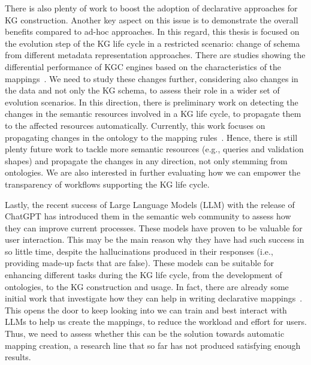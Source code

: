 
There is also plenty of work to boost the adoption of declarative approaches for KG construction. Another key aspect on this issue is to demonstrate the overall benefits compared to ad-hoc approaches. In this regard, this thesis is focused on the evolution step of the KG life cycle in a restricted scenario: change of schema from different metadata representation approaches. There are studies showing the differential performance of KGC engines based on the characteristics of the mappings~\parencite{chaves2019parameters}. We need to study these changes further, considering also changes in the data and not only the KG schema, to assess their role in a wider set of evolution scenarios. 
In this direction, there is preliminary work on detecting the changes in the semantic resources involved in a KG life cycle, to propagate them to the affected resources automatically. Currently, this work focuses on propagating changes in the ontology to the mapping rules~\parencite{herreros2024propagating}. Hence, there is still plenty future work to tackle more semantic resources (e.g., queries and validation shapes) and propagate the changes in any direction, not only stemming from ontologies. 
We are also interested in further evaluating how we can empower the transparency of workflows supporting the KG life cycle.

Lastly, the recent success of Large Language Models (LLM) with the release of ChatGPT has introduced them in the semantic web community to assess how they can improve current processes.
These models have proven to be valuable for user interaction. 
This may be the main reason why they have had such success in so little time, despite the hallucinations produced in their responses (i.e., providing made-up facts that are false). 
These models can be suitable for enhancing different tasks during the KG life cycle, from the development of ontologies, to the KG construction and usage. 
In fact, there are already some initial work that investigate how they can help in writing declarative mappings~\parencite{randles2024r2rmlchatgpt,hofer2024towards}. This opens the door to keep looking into we can train and best interact with LLMs to help us create the mappings, to reduce the workload and effort for users. Thus, we need to assess whether this can be the solution towards automatic mapping creation, a research line that so far has not produced satisfying enough results. 



